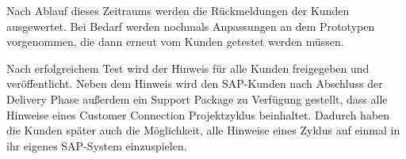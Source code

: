 Nach Ablauf dieses Zeitraums werden die Rückmeldungen der Kunden ausgewertet. Bei Bedarf werden nochmals Anpassungen an dem Prototypen vorgenommen, die dann erneut vom Kunden getestet werden müssen.

Nach erfolgreichem Test wird der Hinweis für alle Kunden freigegeben und veröffentlicht. Neben dem Hinweis wird den SAP-Kunden nach Abschluss der Delivery Phase außerdem ein Support Package zu Verfügung gestellt, dass alle Hinweise eines Customer Connection Projektzyklus beinhaltet. Dadurch haben die Kunden später auch die Möglichkeit, alle Hinweise eines Zyklus auf einmal in ihr eigenes SAP-System einzuspielen.


